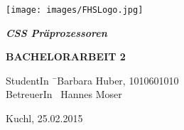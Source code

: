 \begin{titlepage}
\begin{center}

\texttt{[image: images/FHSLogo.jpg]}

\vspace*{4cm}

\Large{
	\textit{\textbf{CSS Präprozessoren}}
}

\vspace*{4cm}

\large{
	\textbf{BACHELORARBEIT 2}
}

\end{center}

\vfill

\begin{tabbing}
StudentIn \= \ Barbara Huber, 1010601010 \\
BetreuerIn \> \ Hannes Moser
\end{tabbing}

Kuchl, 25.02.2015

\end{titlepage}
